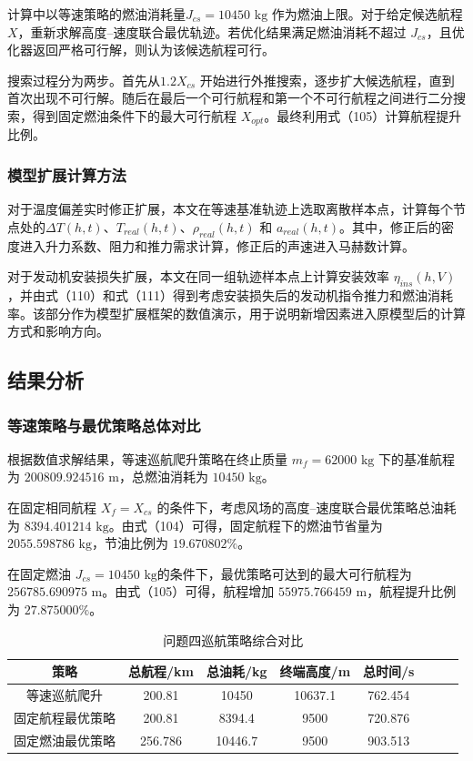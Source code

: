 \documentclass[UTF8]{ctexart}
\begin{document}
计算中以等速策略的燃油消耗量$J_{cs}=10450\text{ kg}$ 作为燃油上限。对于给定候选航程 $X$，重新求解高度–速度联合最优轨迹。若优化结果满足燃油消耗不超过 $J_{cs}$，且优化器返回严格可行解，则认为该候选航程可行。

搜索过程分为两步。首先从$1.2X_{cs}$ 开始进行外推搜索，逐步扩大候选航程，直到首次出现不可行解。随后在最后一个可行航程和第一个不可行航程之间进行二分搜索，得到固定燃油条件下的最大可行航程 $X_{opt}$。最终利用式（105）计算航程提升比例。
\subsubsection{模型扩展计算方法}
对于温度偏差实时修正扩展，本文在等速基准轨迹上选取离散样本点，计算每个节点处的$\Delta T(h,t)$、$T_{real}(h,t)$、$\rho_{real}(h,t)$ 和 $a_{real}(h,t)$。其中，修正后的密度进入升力系数、阻力和推力需求计算，修正后的声速进入马赫数计算。

对于发动机安装损失扩展，本文在同一组轨迹样本点上计算安装效率 $\eta_{ins}(h,V)$，并由式（110）和式（111）得到考虑安装损失后的发动机指令推力和燃油消耗率。该部分作为模型扩展框架的数值演示，用于说明新增因素进入原模型后的计算方式和影响方向。
\subsection{结果分析}
\subsubsection{等速策略与最优策略总体对比}
根据数值求解结果，等速巡航爬升策略在终止质量 $m_f=62000\text{ kg}$ 下的基准航程为 $200809.924516\text{ m}$，总燃油消耗为 $10450\text{ kg}$。

在固定相同航程 $X_f=X_{cs}$ 的条件下，考虑风场的高度–速度联合最优策略总油耗为 $8394.401214\text{ kg}$。由式（104）可得，固定航程下的燃油节省量为 $2055.598786\text{ kg}$，节油比例为 $19.670802\%$。

在固定燃油 $J_{cs}=10450\text{ kg}$的条件下，最优策略可达到的最大可行航程为 $256785.690975\text{ m}$。由式（105）可得，航程增加 $55975.766459\text{ m}$，航程提升比例为 $27.875000\%$。
\begin{table}[htbp]
\centering
\caption{问题四巡航策略综合对比}
\label{tab:comprehensive_comparison}
\begin{tabular}{cccccccc}
\toprule
 策略 & 总航程/km & 总油耗/kg & 终端高度/m  & 总时间/s \\
\midrule
 等速巡航爬升 & 200.81 & 10450 & 10637.1 & 762.454 \\
 固定航程最优策略 & 200.81 & 8394.4  & 9500 & 720.876 \\
 固定燃油最优策略 & 256.786 & 10446.7  & 9500 & 903.513 \\
\bottomrule
\end{tabular}
\end{table}
\end{document}
